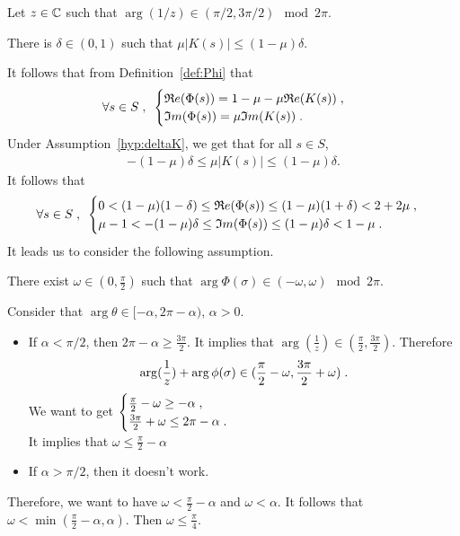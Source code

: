 \documentclass[11pt]{amsart}
\renewcommand{\Re}{\mathfrak{R}e}
\renewcommand{\Im}{\mathfrak{I}m}
\begin{document}
Let $z \in \mathbb{C}$ such that $\arg(1/z) \in (\pi/2, 3\pi/2) \mod 2\pi$.
\begin{hypothesis}
    There is $\delta \in (0,1)$ such that $ \mu |K(s)| \leq (1-\mu)\delta$.
    \label{hyp:deltaK}
\end{hypothesis}
It follows that from Definition~\eqref{def:Phi} that 
$$\forall s \in S \eqsepv 
\begin{cases}
    \Re(\Phi(s)) = 1-\mu-\mu \Re(K(s))\eqsepv \\
    \Im(\Phi(s)) = \mu \Im(K(s))\eqfinp
\end{cases}
$$
Under Assumption~\ref{hyp:deltaK}, we get that for all $s \in S$, 
    \begin{align*}
     -(1-\mu)\delta \leq \mu |K(s)| \leq (1-\mu)\delta.
    \end{align*}
It follows that
$$\forall s \in S \eqsepv 
\begin{cases}
    0 < (1-\mu)(1-\delta) \leq \Re(\Phi(s)) \leq (1-\mu)(1+\delta) < 2 + 2\mu \eqfinv
    \\ 
   \mu-1 < -(1-\mu) \delta \leq \Im(\Phi(s)) \leq (1-\mu) \delta < 1-\mu \eqfinp
\end{cases}
$$
It leads us to consider the following assumption.
\begin{hypothesis}
There exist $\omega \in \left(0, \frac\pi2 \right)$ such that $\arg\Phi(\sigma) \in (-\omega, \omega) \mod 2\pi$.   
\end{hypothesis}

Consider that $\arg \theta \in [-\alpha, 2\pi-\alpha)$, $\alpha > 0$.
\begin{itemize}
    \item If $\alpha < \pi / 2$, then 
    $2\pi - \alpha \geq \frac{3\pi}{2}$. It implies that $\arg(\frac1z) \in (\frac\pi2, \frac{3\pi}{2})$. Therefore
    $$ \arg(\frac1z) + \arg \phi(\sigma) \in (\frac\pi2 - \omega, \frac{3\pi}{2}+\omega)\; .$$
    We want to get 
    $\begin{cases}
        \frac{\pi}{2}-\omega \geq - \alpha \; , \enspace
        \\
        \frac{3\pi}{2}+\omega \leq 2\pi-\alpha \; .
    \end{cases}$ \\
    It implies that $\omega \leq \frac{\pi}{2}-\alpha$
    \item If $\alpha > \pi / 2$, then it doesn't work. 
\end{itemize}
Therefore, we want to have $ \omega < \frac{\pi}{2}-\alpha$ and $\omega < \alpha$.
It follows that $\omega < \min(\frac\pi2 - \alpha, \alpha)$. Then $\omega \leq \frac\pi4$.  
\end{document}
